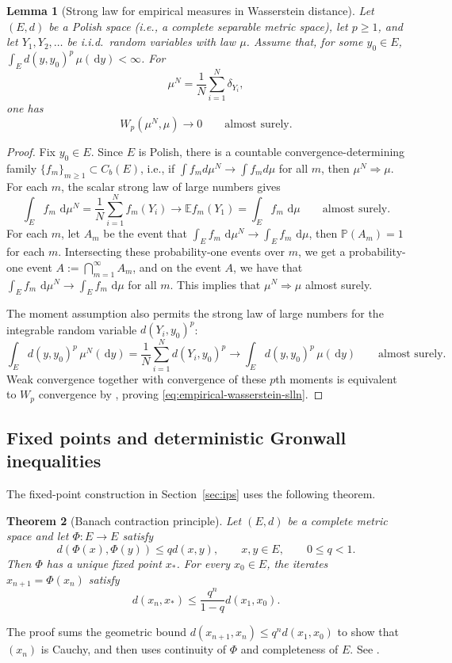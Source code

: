 \documentclass[11pt]{amsart}
\numberwithin{equation}{section}
\theoremstyle{plain}
\newtheorem{theorem}{Theorem}[section]
\newtheorem{lemma}[theorem]{Lemma}
\newcommand{\E}{\mathbb{E}}
\newcommand{\Prob}{\mathbb{P}}
\newcommand{\dd}{\,\mathrm{d}}
\begin{document}
\begin{lemma}[Strong law for empirical measures in Wasserstein distance]
\label{lem:empirical-wasserstein-slln}
Let $(E,d)$ be a Polish space (i.e., a complete separable metric space), let $p\geq1$, and let $Y_1,Y_2,\ldots$ be i.i.d.\ random variables with law $\mu$.  Assume that,
for some $y_0\in E$,
$\int_E d(y,y_0)^p\,\mu(\dd y)<\infty$.  For
\[
 \mu^N=\frac1N\sum_{i=1}^N\delta_{Y_i},
\]
one has
\begin{equation}\label{eq:empirical-wasserstein-slln}
 W_p(\mu^N,\mu)\longrightarrow0
 \qquad\text{almost surely}.
\end{equation}
\end{lemma}
\begin{proof}
Fix $y_0\in E$.  Since $E$ is Polish, there is a countable
convergence-determining family
$\{f_m\}_{m\geq1}\subset C_b(E)$, i.e., if $\int f_m d\mu^N \to \int f_m d\mu$ for all $m$, then $\mu^N \Rightarrow \mu$.  For each $m$, the scalar strong law of large numbers gives
\[
 \int_E f_m\,\dd\mu^N
 =\frac1N\sum_{i=1}^N f_m(Y_i)
 \longrightarrow \E f_m(Y_1)
 =\int_E f_m\,\dd\mu
 \qquad\text{almost surely}.
\]
For each $m$, let $A_m$ be the event that $\int_E f_m\,\dd\mu^N \to \int_E f_m\,\dd\mu$, then $\Prob(A_m) = 1$ for each $m$. Intersecting these probability-one events over $m$, we get a probability-one event $A:=\bigcap_{m=1}^\infty A_m$, and on the event $A$, we have that $\int_E f_m\,\dd\mu^N \to \int_E f_m\,\dd\mu$ for all $m$. This implies that $\mu^N \Rightarrow \mu$ almost surely.

The moment assumption also permits the
strong law of large numbers for the integrable random variable $d(Y_i,y_0)^p$:
\[
 \int_E d(y,y_0)^p\,\mu^N(\dd y)
 =\frac1N\sum_{i=1}^N d(Y_i,y_0)^p
 \longrightarrow
 \int_E d(y,y_0)^p\,\mu(\dd y)
 \qquad\text{almost surely}.
\]
Weak convergence together with convergence of these $p$th moments is
equivalent to $W_p$ convergence by
\cite[Theorem~6.9]{Villani2009}, proving
\eqref{eq:empirical-wasserstein-slln}.  
\end{proof}


\subsection{Fixed points and deterministic Gronwall inequalities}

The fixed-point construction in Section~\ref{sec:ips} uses the following theorem.

\begin{theorem}[Banach contraction principle]
\label{thm:appendix-banach}
Let $(E,d)$ be a complete metric space and let $\Phi:E\to E$ satisfy
\[
 d(\Phi(x),\Phi(y))\leq qd(x,y),
 \qquad x,y\in E,\qquad 0\leq q<1.
\]
Then $\Phi$ has a unique fixed point $x_\ast$.  For every $x_0\in E$, the
iterates $x_{n+1}=\Phi(x_n)$ satisfy
\begin{equation}\label{eq:appendix-banach-rate}
 d(x_n,x_\ast)\leq\frac{q^n}{1-q}d(x_1,x_0).
\end{equation}
\end{theorem}
The proof sums the geometric bound
$d(x_{n+1},x_n)\leq q^nd(x_1,x_0)$ to show that $(x_n)$ is Cauchy, and then
uses continuity of $\Phi$ and completeness of $E$.  See
\cite[Theorem~2.1]{Teschl2012}.
\end{document}

